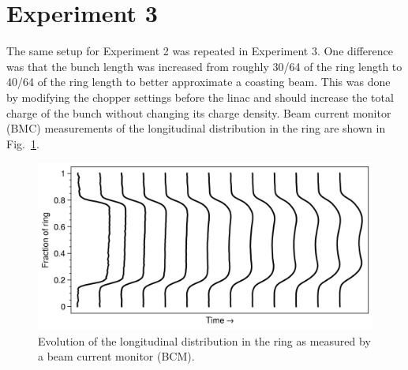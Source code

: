 \section{Experiment 3}

The same setup for Experiment 2 was repeated in Experiment 3. One difference was that the bunch length was increased from roughly 30/64 of the ring length to 40/64 of the ring length to better approximate a coasting beam. This was done by modifying the chopper settings before the linac and should increase the total charge of the bunch without changing its charge density. Beam current monitor (BMC) measurements of the longitudinal distribution in the ring are shown in Fig.~\ref{fig:bcm_waterfall}.
%
\begin{figure}[!p]
    \centering
    \includegraphics[width=\textwidth]{Images/chapter5/exp3/bcm_waterfall.png}
    \caption{Evolution of the longitudinal distribution in the ring as measured by a beam current monitor (BCM).}
    \label{fig:bcm_waterfall}
\end{figure}
%

